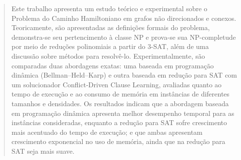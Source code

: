 \begin{abstract}
Este trabalho apresenta um estudo teórico e experimental sobre o Problema do Caminho Hamiltoniano em grafos não direcionados e conexos. Teoricamente, são apresentadas as definições formais do problema, demonstra-se seu pertencimento à classe NP e prova-se sua NP-completude por meio de reduções polinomiais a partir do 3-SAT, além de uma discussão sobre métodos para resolvê-lo. Experimentalmente, são comparadas duas abordagens exatas: uma baseada em programação dinâmica (Bellman--Held--Karp) e outra baseada em redução para SAT com um solucionador Conflict-Driven Clause Learning, avaliadas quanto ao tempo de execução e ao consumo de memória em instâncias de diferentes tamanhos e densidades. Os resultados indicam que a abordagem baseada em programação dinâmica apresenta melhor desempenho temporal para as instâncias consideradas, enquanto a redução para SAT sofre crescimento mais acentuado do tempo de execução; e que ambas apresentam crescimento exponencial no uso de memória, ainda que na redução para SAT seja mais suave.
\end{abstract}